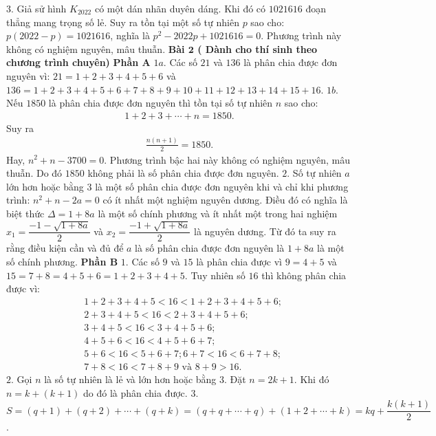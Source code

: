 \begin{multicols}{2}
	\vskip 0.05cm
	$3.$ Giả sử hình  $K_{2022}$ có một dán nhãn duyên dáng. Khi đó có $1 021 616$ đoạn thẳng mang trọng số lẻ. Suy ra tồn tại một số tự nhiên $p$ sao cho: $p(2022-p)=1 021 616$, nghĩa là $p^2-2022p+1 021 616=0$. Phương trình này không có nghiệm nguyên, mâu thuẫn. 
	\vskip 0.05cm
	\textbf{\color{cackithi}Bài $\pmb{2}$ ( Dành cho thí sinh theo chương trình chuyên)} 
	\vskip 0.05cm
	\textbf{\color{cackithi}Phần A}
	\vskip 0.05cm
	$1a$. Các số $21$ và $136$ là phân chia được đơn nguyên vì: $21=1+2+3+4+5+6$ và $136=1+2+3+4+5+6+7+8+9+10+11+12+13+14+15+16$.
	\vskip 0.05cm 
	$1b.$ Nếu $1850$ là phân chia được đơn nguyên thì tồn tại số tự nhiên $n$ sao cho: 
	\begin{align*}
		1+2+3+\cdots+n=1850.
	\end{align*}
	Suy ra 
	\begin{align*}
		\frac{n(n+1)}{2} = 1850.
	\end{align*}
	Hay, $n^2+n-3700=0$. Phương trình bậc hai này không có nghiệm nguyên, mâu thuẫn. Do đó $1850$ không phải là số phân chia được đơn nguyên. 
	\vskip 0.05cm
	$2.$ Số tự nhiên $a$ lớn hơn hoặc bằng $3$ là một số phân chia được đơn nguyên khi và chỉ khi phương trình: $n^2+n-2a=0$ có ít nhất một nghiệm nguyên dương. Điều đó có nghĩa là biệt thức $\Delta=1+8a$ là một số chính phương và ít nhất một trong hai nghiệm \linebreak$x_1=\dfrac{-1-\sqrt{1+ 8a}}{2}$ và $x_2=\dfrac{-1+\sqrt{1+ 8a}}{2}$ là nguyên dương. Từ đó ta suy ra rằng điều kiện cần và đủ để $a$ là số phân chia được đơn nguyên là $1+8a$ là một số chính phương.
	\vskip 0.05cm  
	\textbf{\color{cackithi}Phần B}
	\vskip 0.05cm
	$1.$ Các số $9$ và $15$ là phân chia được vì $9=4+5$ và $15=7+8=4+5+6=1+2+3+4+5$. Tuy nhiên số $16$ thì không phân chia được vì:
	\begin{align*}
		&1\!+\!2\!+\!3\!+\!4\!+\!5\!<\!16\!<\!1\!+\!2\!+\!3\!+\!4\!+\!5\!+\!6;\\
		&2+3+4+5<16<2+3+4+5+6;\\
		&3+4+5<16<3+4+5+6;\\
		&4+5+6<16<4+5+6+7;\\
		&5\!+\!6\!<\!16\!<\!5\!+\!6\!+\!7; 6\!+\!7\!<\!16\!<\!6\!+\!7\!+\!8;\\
		&7+8<16<7+8+9 \text{ và } 8+9>16.
	\end{align*}
	$2.$ Gọi $n$ là số tự nhiên là lẻ và lớn hơn hoặc bằng $3$. Đặt $n=2k+1$. Khi đó $n=k+(k+1)$ do đó là phân chia được.
	\vskip 0.05cm  
	$3.$ $S=(q+1)+(q+2)+\cdots+(q+k)=(q+q+\cdots+q)+(1+2+\cdots+k)=kq+\dfrac{k(k+1)}{2}$.
	\vskip 0.05cm

\end{multicols}
